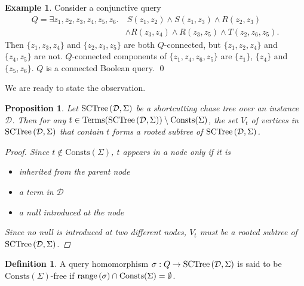 \documentclass[12pt]{report}
\theoremstyle{plain}
\newtheorem{proposition}[theorem]{Proposition}
\theoremstyle{definition}
\newtheorem{definition}[theorem]{Definition}
\newtheorem{example}[theorem]{Example}
\def\Consts{{\mathrm{Consts}}}
\def\Terms{{\mathrm{Terms}}}
\newcommand{\range}[1]{\ensuremath{\normalfont{\operatorname{range}} \left( #1 \right)}}
\newcommand{\SCTree}[2]{\ensuremath{\normalfont{\textrm{SCTree}} \left( #1, #2 \right)}}
\begin{document}
\begin{example}
\label{query-connectedness-example}
  Consider a conjunctive query
  \begin{align*}
    Q = \exists z_1,z_2,z_3,z_4,z_5,z_6.&\ S(z_1, z_2) \wedge S(z_1,z_3) \wedge R(z_2, z_3) \\
    &\wedge R(z_3, z_4) \wedge R(z_3, z_5) \wedge T(z_2, z_6, z_5).
  \end{align*}
  Then $\{z_1, z_3, z_4\}$ and $\{z_2, z_3, z_5\}$ are both $Q$-connected, but $\{z_1, z_2, z_4\}$ and $\{z_4, z_5\}$ are not. $Q$-connected components of $\{z_1, z_4, z_6, z_5\}$ are $\{z_1\}$, $\{z_4\}$ and $\{z_5, z_6\}$. $Q$ is a connected Boolean query.
  \qed
\end{example}

We are ready to state the observation.

\begin{proposition}
\label{term-subtree-is-connected-for-non-rule-constants}
  Let $\SCTree{\mathcal{D}}{\Sigma}$ be a shortcutting chase tree over an instance $\mathcal{D}$. Then for any $t \in \Terms(\SCTree{\mathcal{D}}{\Sigma}) \setminus \Consts(\Sigma)$, the set $V_t$ of vertices in $\SCTree{\mathcal{D}}{\Sigma}$ that contain $t$ forms a rooted subtree of $\SCTree{\mathcal{D}}{\Sigma}$.
  \begin{proof}
    Since $t \not\in \Consts(\Sigma)$, $t$ appears in a node only if it is
    \begin{itemize}
      \item inherited from the parent node
      \item a term in $\mathcal{D}$
      \item a null introduced at the node
    \end{itemize}
    Since no null is introduced at two different nodes, $V_t$ must be a rooted subtree of $\SCTree{\mathcal{D}}{\Sigma}$.
  \end{proof}
\end{proposition}

\begin{definition}
  A query homomorphism $\sigma: Q \rightarrow \SCTree{\mathcal{D}}{\Sigma}$ is said to be $\Consts(\Sigma)$-free if $\range{\sigma} \cap \Consts(\Sigma) = \emptyset$.
\end{definition}
\end{document}
